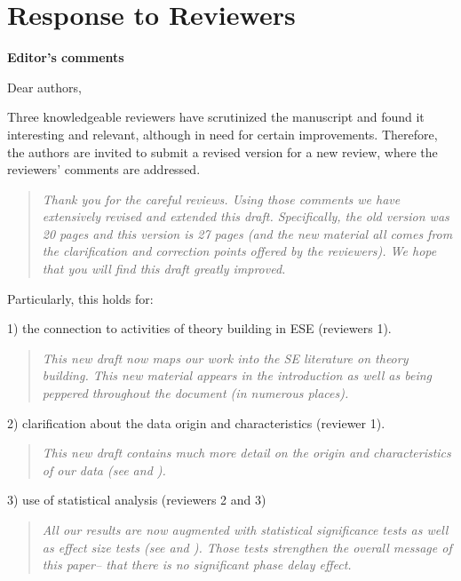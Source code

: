  \section*{Response to Reviewers}

 
{\bf Editor's comments}
 
Dear authors,

Three knowledgeable reviewers have scrutinized the manuscript
and found it interesting and relevant,  although in need for
certain improvements. Therefore, the authors are
 invited to submit a revised version for a new review, where
 the reviewers' comments
are addressed.

\begin{quote} {\em Thank you for the careful reviews. Using
those comments we have extensively revised and extended this draft.
Specifically, the old version was 20 pages and this version is 27 pages (and the new
material all comes from the clarification and correction points offered by the reviewers).
We hope that  you will find this draft greatly improved.}
\end{quote}

Particularly, this holds for:


1) the connection to activities of theory building in ESE
(reviewers 1).  


 

\begin{quote}{\em This new draft now maps our work into the SE literature on theory building. This new material appears in the introduction as well as being
peppered throughout the document (in numerous places).}\end{quote}
 
2) clarification about the data origin and
characteristics (reviewer 1). 
 

\begin{quote}{\em
This new draft contains much more detail on the origin and characteristics of our data (see  and ).}\end{quote}

3)  use of statistical analysis (reviewers 2 and 3) 

\begin{quote}{\em All our results are now augmented with statistical significance tests as well as effect size tests (see  and ). Those tests strengthen the overall message of this paper-- that there is no significant
phase delay effect.}\end{quote}

